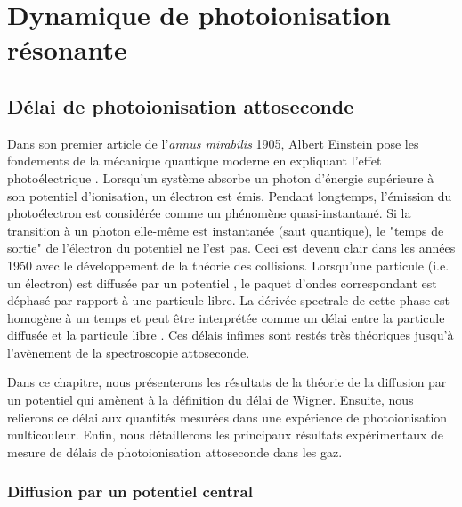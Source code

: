 \part{Dynamique de photoionisation résonante}
\label{part:Delais}
\chapter{Délai de photoionisation attoseconde}
\label{chap:DelaiPI}
Dans son premier article de l'\textit{annus mirabilis} 1905, Albert Einstein pose les fondements de la mécanique quantique moderne en expliquant l'effet photoélectrique . Lorsqu'un système absorbe un photon d'énergie supérieure à son potentiel d'ionisation, un électron est émis. Pendant longtemps, l'émission du photoélectron est considérée comme un phénomène quasi-instantané. Si la transition à un photon  elle-même est instantanée (saut quantique), le "temps de sortie" de l'électron du potentiel ne l'est pas. Ceci est devenu clair dans les années 1950 avec le développement de la théorie des collisions. Lorsqu'une particule (i.e. un électron) est diffusée par un potentiel , le paquet d'ondes correspondant est déphasé par rapport à une particule libre. La dérivée spectrale de cette phase est homogène à un temps et peut être interprétée comme un délai entre la particule diffusée et la particule libre . Ces délais infimes sont restés très théoriques jusqu'à l'avènement de la spectroscopie attoseconde.

Dans ce chapitre, nous présenterons les résultats de la théorie de la diffusion par un potentiel qui amènent à la définition du délai de Wigner. Ensuite, nous relierons ce délai aux quantités mesurées dans une expérience de photoionisation multicouleur. Enfin, nous détaillerons les principaux résultats expérimentaux de mesure de délais de photoionisation attoseconde dans les gaz.

\section{Diffusion par un potentiel central}
\label{sec:DiffusionPotentielCentral}
